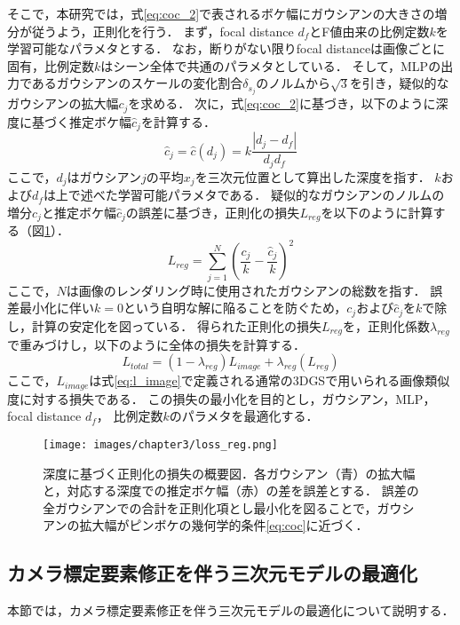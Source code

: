 そこで，本研究では，式\ref{eq:coc_2}で表されるボケ幅にガウシアンの大きさの増分が従うよう，正則化を行う．
まず，focal distance $d_f$とF値由来の比例定数$k$を学習可能なパラメタとする．
なお，断りがない限りfocal distanceは画像ごとに固有，比例定数$k$はシーン全体で共通のパラメタとしている．
そして，MLPの出力であるガウシアンのスケールの変化割合$\delta_{s_j}$のノルムから$\sqrt{3}$を引き，疑似的なガウシアンの拡大幅$c_j$を求める．
次に，式\ref{eq:coc_2}に基づき，以下のように深度に基づく推定ボケ幅$\hat{c}_j$を計算する．
\begin{equation}
	\hat{c}_j = \hat{c}(d_j) = k \frac{\left|d_j-d_f\right|}{d_jd_f}
	\label{eq:loss_reg}
\end{equation}
ここで，$d_j$はガウシアン$j$の平均$x_j$を三次元位置として算出した深度を指す．
$k$および$d_f$は上で述べた学習可能パラメタである．
疑似的なガウシアンのノルムの増分$c_j$と推定ボケ幅$\hat{c}_j$の誤差に基づき，正則化の損失$L_{reg}$を以下のように計算する（図\ref{fig:loss_reg}）．
\begin{equation}
	L_{reg}=\sum_{j=1}^N\left(\frac{c_j}{k}-\frac{\hat{c}_j}{k}\right)^2
	\label{eq:loss_reg}
\end{equation}
ここで，$N$は画像のレンダリング時に使用されたガウシアンの総数を指す．
誤差最小化に伴い$k=0$という自明な解に陥ることを防ぐため，$c_j$および$\hat{c}_j$を$k$で除し，計算の安定化を図っている．
得られた正則化の損失$L_{reg}$を，正則化係数$\lambda_{reg}$で重みづけし，以下のように全体の損失を計算する．
\begin{equation}
	L_{total} = (1-\lambda_{reg})L_{image} + \lambda_{reg}(L_{reg})
	\label{eq:l_total}
\end{equation}
ここで，$L_{image}$は式\ref{eq:l_image}で定義される通常の3DGSで用いられる画像類似度に対する損失である．
この損失の最小化を目的とし，ガウシアン，MLP，focal distance $d_f$， 比例定数$k$のパラメタを最適化する．
\begin{figure}[h]
	\centering
	\texttt{[image: images/chapter3/loss\_reg.png]}
	\caption[深度に基づく正則化の損失の概要図]{深度に基づく正則化の損失の概要図．各ガウシアン（青）の拡大幅と，対応する深度での推定ボケ幅（赤）の差を誤差とする．
	誤差の全ガウシアンでの合計を正則化項とし最小化を図ることで，ガウシアンの拡大幅がピンボケの幾何学的条件\ref{eq:coc}に近づく．}
	\label{fig:loss_reg}
\end{figure}

\subsection{カメラ標定要素修正を伴う三次元モデルの最適化}\label{subsec:pose_correction}
本節では，カメラ標定要素修正を伴う三次元モデルの最適化について説明する．

